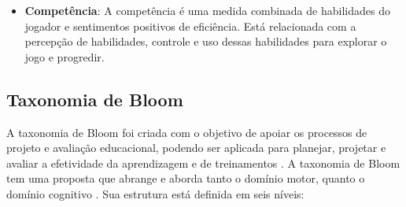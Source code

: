 \begin{itemize}[label={},leftmargin=2em]
\item \textbf{Competência}: A competência é uma medida combinada de habilidades do jogador e sentimentos positivos de eficiência. Está relacionada com a percepção de habilidades, controle e uso dessas habilidades para explorar o jogo e progredir.
\end{itemize}




\subsection{Taxonomia de Bloom}
\label{Bloom}

A taxonomia de Bloom foi criada com o objetivo de apoiar os processos de projeto e avaliação educacional, podendo ser aplicada para planejar, projetar e avaliar a efetividade da aprendizagem e de treinamentos \cite{bloom1956taxonomy}. A taxonomia de Bloom tem uma proposta que abrange e aborda tanto o domínio motor, quanto o domínio cognitivo \cite{moody2003evaluating}. Sua estrutura está definida em seis níveis:

